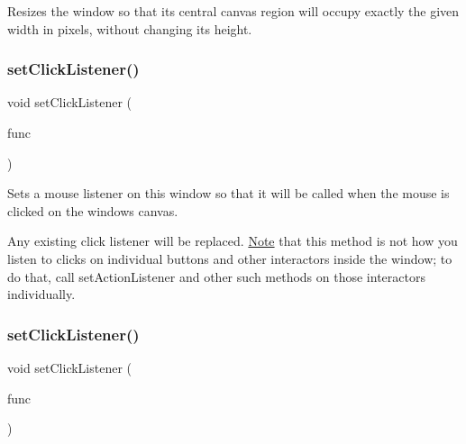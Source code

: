 Resizes the window so that its central canvas region will occupy exactly the given width in pixels, without changing its height. 

\mbox{\label{classGWindow_abd40af6921242584d0954f173911b190}} 
\subsubsection{\texorpdfstring{set\+Click\+Listener()}{setClickListener()}\hspace{0.1cm}{\footnotesize\ttfamily [1/2]}}
{\footnotesize\ttfamily void set\+Click\+Listener (\begin{DoxyParamCaption}\item[{G\+Event\+Listener}]{func }\end{DoxyParamCaption})\hspace{0.3cm}{\ttfamily [virtual]}}



Sets a mouse listener on this window so that it will be called when the mouse is clicked on the window\textquotesingle{}s canvas. 

Any existing click listener will be replaced. \mbox{\hyperlink{classNote}{Note}} that this method is not how you listen to clicks on individual buttons and other interactors inside the window; to do that, call set\+Action\+Listener and other such methods on those interactors individually. \mbox{\label{classGWindow_a856414c92df90f56f3877475eb3f8fc4}} 
\subsubsection{\texorpdfstring{set\+Click\+Listener()}{setClickListener()}\hspace{0.1cm}{\footnotesize\ttfamily [2/2]}}
{\footnotesize\ttfamily void set\+Click\+Listener (\begin{DoxyParamCaption}\item[{G\+Event\+Listener\+Void}]{func }\end{DoxyParamCaption})\hspace{0.3cm}{\ttfamily [virtual]}}



